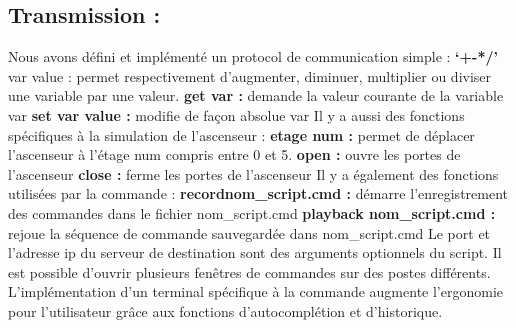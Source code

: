 \documentclass[12pt]{article}
\begin{document}
\subsection{Transmission :}
\newline
Nous avons défini et implémenté un protocol de communication simple :
\newline
\textbf{‘+-*/’} \guilsinglleft{}var\guilsinglright{} value : permet respectivement d’augmenter, diminuer, multiplier ou diviser une variable par une valeur.
\newline
\textbf{get \guilsinglleft{}var\guilsinglright{} :} demande la valeur courante de la variable \guilsinglleft{}var\guilsinglright{}
\newline
\textbf{set \guilsinglleft{}var\guilsinglright{} value :} modifie de façon absolue \guilsinglleft{}var\guilsinglright{}
\newline
\newline
Il y a aussi des fonctions spécifiques à la simulation de l’ascenseur : 
\newline
\textbf{etage \guilsinglleft{}num\guilsinglright{} :} permet de déplacer l’ascenseur à l’étage \guilsinglleft{}num\guilsinglright{} compris entre 0 et 5.
\newline
\textbf{open :} ouvre les portes de l’ascenseur
\newline
\textbf{close :} ferme les portes de l’ascenseur
\newline
\newline
Il y a également des fonctions utilisées par la commande :
\newline
\textbf{record\guilsinglleft{}nom\_script.cmd\guilsinglright{} :} démarre l’enregistrement des commandes dans le fichier \guilsinglleft{}nom\_script.cmd\guilsinglright{}
\newline
\textbf{playback \guilsinglleft{}nom\_script.cmd\guilsinglright{} :} rejoue la séquence de commande sauvegardée dans \guilsinglleft{}nom\_script.cmd\guilsinglright{}
\newline
Le port et l’adresse ip du serveur de destination sont des arguments optionnels du script.
\newline
Il est possible d’ouvrir plusieurs fenêtres de commandes sur des postes différents.
\newline
L’implémentation d’un terminal spécifique à la commande augmente l’ergonomie pour l’utilisateur grâce aux fonctions d'autocomplétion et d’historique.
\end{document}
